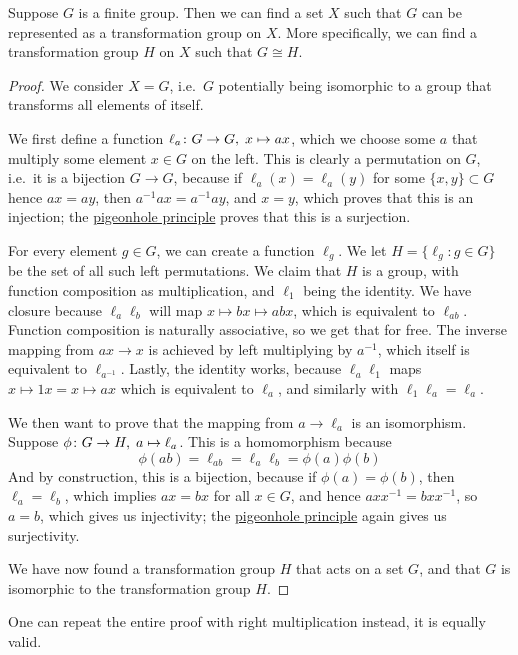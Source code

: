 \begin{theorem}\label{thm:cayley}
    Suppose \(G\) is a finite group.
    Then we can find a set \(X\)
    such that \(G\) can be represented
    as a transformation group on \(X\).
    More specifically,
    we can find a transformation group \(H\) on \(X\)
    such that \(G \cong H\).
\end{theorem}
\begin{proof}
    We consider \(X = G\),
    i.e.\ \(G\) potentially being isomorphic
    to a group that transforms all elements of itself.

    We first define a function \(\ell_a\colon G\to G,\;x\mapsto ax\),
    which we choose some \(a\)
    that multiply some element \(x \in G\) on the left.
    This is clearly a permutation on \(G\),
    i.e.\ it is a bijection \(G \to G\),
    because if \(\ell_a(x) = \ell_a(y)\) for some \(\{x,y\} \subset G\)
    hence \(ax = ay\), then \(a^{-1}ax = a^{-1}ay\), and \(x = y\),
    which proves that this is an injection;
    the \hyperref[thm:pigeonhole]{pigeonhole principle} proves that this is a surjection.

    For every element \(g \in G\),
    we can create a function \(\ell_g\).
    We let \(H = \{\ell_g : g \in G\}\)
    be the set of all such left permutations.
    We claim that \(H\) is a group,
    with function composition as multiplication,
    and \(\ell_1\) being the identity.
    We have closure because \(\ell_a\ell_b\)
    will map \(x \mapsto bx \mapsto abx\),
    which is equivalent to \(\ell_{ab}\).
    Function composition is naturally associative,
    so we get that for free.
    The inverse mapping from \(ax \to x\)
    is achieved by left multiplying by \(a^{-1}\),
    which itself is equivalent to \(\ell_{a^{-1}}\).
    Lastly, the identity works,
    because \(\ell_a\ell_1\) maps \(x \mapsto 1x = x \mapsto ax\)
    which is equivalent to \(\ell_a\),
    and similarly with \(\ell_1\ell_a = \ell_a\).

    We then want to prove that
    the mapping from \(a \to \ell_a\) is an isomorphism.
    Suppose \(\phi\colon G\to H,\;a\mapsto\ell_a\).
    This is a homomorphism because
    \begin{equation*}
        \phi(ab) = \ell_{ab} = \ell_a\ell_b = \phi(a)\phi(b)
    \end{equation*}
    And by construction, this is a bijection,
    because if \(\phi(a) = \phi(b)\),
    then \(\ell_a = \ell_b\),
    which implies \(ax = bx\) for all \(x \in G\),
    and hence \(axx^{-1} = bxx^{-1}\),
    so \(a = b\),
    which gives us injectivity;
    the \hyperref[thm:pigeonhole]{pigeonhole principle} again gives us surjectivity.

    We have now found a transformation group \(H\)
    that acts on a set \(G\),
    and that \(G\) is isomorphic to the transformation group \(H\).
\end{proof}
\begin{remark}
    One can repeat the entire proof with right multiplication instead,
    it is equally valid.
\end{remark}


